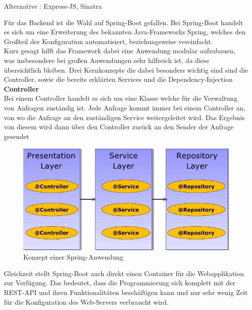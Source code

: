 Alternative : Express-JS, Sinatra

Für das Backend ist die Wahl auf Spring-Boot gefallen. Bei Spring-Boot handelt es sich um eine Erweiterung des bekannten Java-Frameworks Spring, welches den Großteil der Konfiguration automatisiert, beziehungsweise vereinfacht. \\



Kurz gesagt hilft das Framework dabei eine Anwendung modular aufzubauen, was insbesondere bei großen Anwendungen sehr hilfreich ist, da diese übersichtlich bleiben. Drei Kernkonzepte die dabei besonders wichtig sind sind die Controller, sowie die bereits erklärten Services und die Dependency-Injection \\

\textbf{Controller}\\
Bei einem Controller handelt es sich um eine Klasse welche für die Verwaltung von Anfragen zuständig ist. Jede Anfrage kommt immer bei einem Controller an, von wo die Anfrage an den zuständigen Service weitergeleitet wird. Das Ergebnis von diesem wird dann über den Controller zurück an den Sender der Anfrage gesendet \\

\begin{figure}[htp]     %
\centering
\includegraphics[width=1\textwidth]{bilder/SpringLayers} 
\caption[\url{http://image.slidesharecdn.com/springsourceusi2009v3-0-090702135517-phpapp01/95/developing-modular-java-applications-13-728.jpg?cb=1246543977}]{Konzept einer Spring-Anwendung}
\end{figure} 

Gleichzeit stellt Spring-Boot auch direkt einen Container für die Webapplikation zur Verfügung. Das bedeutet, dass die Programmierung sich komplett mit der REST-API und ihren Funktionalitäten beschäftigen kann und nur sehr wenig Zeit für die Konfiguration des Web-Servers verbraucht wird.

